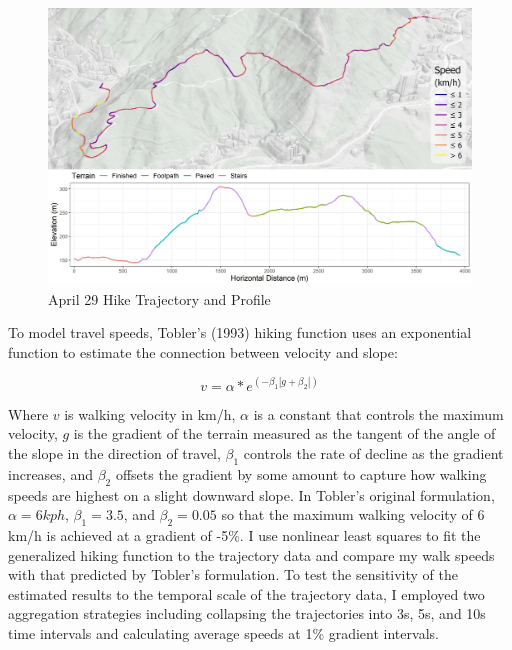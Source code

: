 \documentclass{article}
\begin{document}
\begin{figure}[H]
\includegraphics[width=1\linewidth]{./img/Fig_1} \caption{April 29 Hike Trajectory and Profile}\label{fig:fig-profile}
\end{figure}

To model travel speeds, Tobler's (1993) hiking function uses an
exponential function to estimate the connection between velocity and
slope:

\[
v = \alpha * e^{(-\beta_1 |g + \beta_2|)}
\]

Where \(v\) is walking velocity in km/h, \(\alpha\) is a constant that
controls the maximum velocity, \(g\) is the gradient of the terrain
measured as the tangent of the angle of the slope in the direction of
travel, \(\beta_1\) controls the rate of decline as the gradient
increases, and \(\beta_2\) offsets the gradient by some amount to
capture how walking speeds are highest on a slight downward slope. In
Tobler's original formulation, \(\alpha = 6 kph\), \(\beta_1 = 3.5\),
and \(\beta_2 = 0.05\) so that the maximum walking velocity of 6 km/h is
achieved at a gradient of -5\%. I use nonlinear least squares to fit the
generalized hiking function to the trajectory data and compare my walk
speeds with that predicted by Tobler's formulation. To test the
sensitivity of the estimated results to the temporal scale of the
trajectory data, I employed two aggregation strategies including
collapsing the trajectories into 3s, 5s, and 10s time intervals and
calculating average speeds at 1\% gradient intervals.
\end{document}
